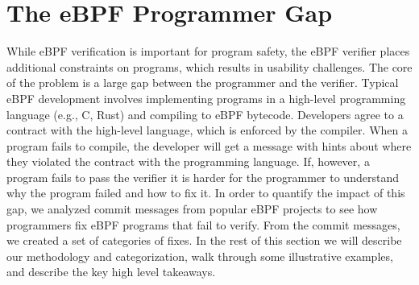 \section{The eBPF Programmer Gap}
\label{sec:motivation}

While eBPF verification is important for program safety, the eBPF verifier
    places additional constraints on programs, which results in usability challenges.
The core of the problem is a large gap between the programmer and the
    verifier.
Typical eBPF development involves implementing programs in a high-level
    programming language (e.g., C, Rust) and compiling to eBPF bytecode.
Developers agree to a contract with the high-level language, which is
    enforced by the compiler.
When a program fails to compile, the developer will get a message with
    hints about where they violated
    the contract with the programming language.
If, however, a program fails to pass the verifier it is harder for the programmer
    to understand why the program failed and how to fix it.
In order to quantify the impact of this gap,
    we analyzed commit messages from popular eBPF projects to see how programmers fix
    eBPF programs that fail to verify.
From the commit messages, we created a set of categories of fixes.
In the rest of this section we will describe our methodology and categorization, walk through some illustrative examples, and describe the key high level takeaways.




%

